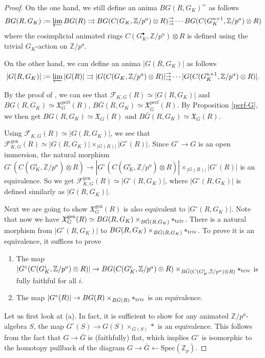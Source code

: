 \documentclass[10pt]{article}
\numberwithin{equation}{section}
\newcommand{\frakX}{{\mathfrak X}}
\newcommand{\bZ}{{\mathbb Z}}
\newcommand{\calF}{{\mathcal F}}
\newcommand{\Spec}{{\mathrm{Spec}}}         %
\newcommand{\gen}{{\mathrm{gen}}}
\newcommand{\perf}{\mathrm{perf}}           %
\newcommand\rightthreearrow{\substack{\rightarrow\\[-1em] \rightarrow \\[-1em] \rightarrow}
}
\begin{document}
\begin{proof}
 On the one hand, we still define an anima $BG(R,G_K)^{\simeq}$ as follows 
\[
BG(R,G_K):=\varprojlim BG(R)\rightrightarrows BG(C(G_K,\bZ/p^a)\otimes R)\rightthreearrow\cdots BG(C(G_K^{n+1},\bZ/p^a)\otimes R)
\]
where the cosimplicial animated rings $C(G_K^{\bullet},\bZ/p^a)\otimes R$ is defined using the trivial $G_K$-action on $\bZ/p^a$.

On the other hand, we can define an anima $|G(R,G_K)|$ as follows
\[
|G(R,G_K)|:=\varprojlim |G(R)|\rightrightarrows |G(C(G_K,\bZ/p^a)\otimes R)|\rightthreearrow\cdots |G(C(G_K^{n+1},\bZ/p^a)\otimes R)|.
\]

By the proof of \cite[Proposition 3.47]{Min23}, we can see that $\calF_{K,G}(R)\simeq |G(R,G_K)|$ and $BG(R,G_K)\simeq \frakX_G^{\perf}(R)$, $B\bar G(R,G_K)\simeq \frakX_{\bar G}^{\perf}(R)$. By Proposition \ref{perf-G}, we then get $BG(R,G_K)\simeq \frakX_G(R)$ and $B\bar G(R,G_K)\simeq \frakX_{\bar G}(R)$.

Using $\calF_{K,G}(R)\simeq |G(R,G_K)|$, we see that $\calF_{K,G}^{\gen}(R)\simeq |G(R,G_K)|\times_{|G(R)|}|G^{\circ}(R)|$. Since $G^{\circ}\to G$ is an open immersion, the natural morphism $G^{\circ}(C(G_K^{i},\bZ/p^a)\otimes R)\to |G^{\circ}(C(G_K^{i},\bZ/p^a)\otimes R)|\times_{|G(R)|}|G^{\circ}(R)|$ is an equivalence. So we get $\calF_{K,G}^{\gen}(R)\simeq |G^{\circ}(R,G_K)|$, where $|G^{\circ}(R,G_K)|$ is defined similarly as $|G(R,G_K)|$.


Next we are going to show $\frakX_G^{\gen}(R)$ is also equivalent to $|G^{\circ}(R,G_K)|$. Note that now we have $\frakX_G^{\gen}(R)\simeq BG(R,G_K)\times_{B\bar G(R,G_K)}*_{\rm triv}$. There is a natural morphism from $|G^{\circ}(R,G_K)|$ to $BG(R,G_K)\times_{B\bar G(R,G_K)}*_{\rm triv}$. To prove it is an equivalence, it suffices to prove
\begin{enumerate}
    \item[(a)] The map  $|G^{\circ}(C(G_K^{i},\bZ/p^a)\otimes R)|\to BG(C(G_K^{i},\bZ/p^a)\otimes R)\times_{B\bar G(C(G_K^{i},\bZ/p^a)\otimes R)}*_{\rm triv}$ is fully faithful for all $i$.
    \item[(b)] The map $|G^{\circ}(R)|\to BG(R)\times_{B\bar G(R)}*_{\rm triv}$ is an equivalence.
\end{enumerate}

Let us first look at (a). In fact, it is sufficient to show for any animated $\bZ/p^a$-algebra $S$, the map $G^{\circ}(S)\to G(S)\times_{\bar G(S)}*$ is an equivalence. This follows from the fact that $G\to \bar G$ is (faithfully) flat, which implies $G^{\circ}$ is isomorphic to the homotopy pullback of the diagram $G\to \bar G\leftarrow \Spec(\bZ_p)$.




\end{proof}
\end{document}
